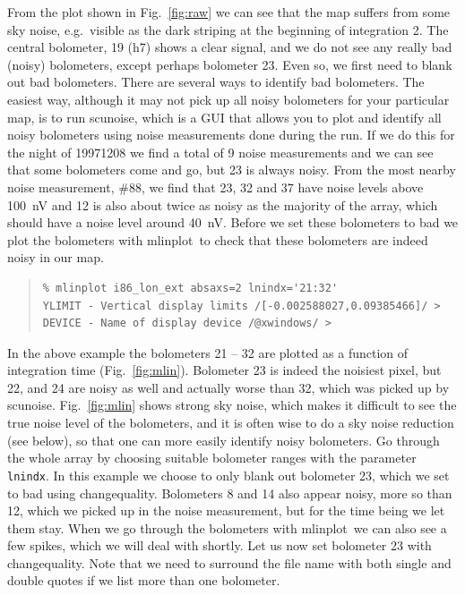 \documentclass[twoside,11pt]{article}
\newenvironment{myquote}{\begin{quote}\begin{small}}{\end{small}\end{quote}}
\newcommand{\task}[1]{\textsf{#1}}
\newcommand{\chgqual}{\xref{\task{change\_\-qua\-lity}}{sun216}{CHANGE_QUALITY}}
\newcommand{\scunoise}{\xref{\task{scunoise}}{sun216}{SCUNOISE}}
\newcommand{\mlinplot}{\xref{\task{mlinplot}}{sun95}{MLINPLOT}}
\newcommand{\xref}[3]{#1}
\renewcommand{\_}{\texttt{\symbol{95}}}
\begin{document}
From the plot shown in Fig.\ \ref{fig:raw} we can see that the map
suffers from some sky noise, e.g.\ visible as the dark striping at the
beginning of integration 2.  The central bolometer, 19 (h7) shows a
clear signal, and we do not see any really bad (noisy) bolometers,
except perhaps bolometer 23.  Even so, we first need to blank out bad
bolometers.  There are several ways to identify bad bolometers.  The
easiest way, although it may not pick up all noisy bolometers for your
particular map, is to run \scunoise, which is a GUI that allows you to
plot and identify all noisy bolometers using noise measurements done
during the run.  If we do this for the night of 19971208 we find a
total of 9 noise measurements and we can see that some bolometers come
and go, but 23 is always noisy.  From the most nearby noise
measurement, \#88, we find that 23, 32 and 37 have noise levels above
100~nV and 12 is also about twice as noisy as the majority of the
array, which should have a noise level around 40~nV. Before we set
these bolometers to bad we plot the bolometers with \mlinplot\ to
check that these bolometers are indeed noisy in our map.


\begin{myquote}
\begin{verbatim}
% mlinplot i86_lon_ext absaxs=2 lnindx='21:32'
YLIMIT - Vertical display limits /[-0.002588027,0.09385466]/ > 
DEVICE - Name of display device /@xwindows/ >
\end{verbatim}
\end{myquote}

In the above example the bolometers 21 -- 32 are plotted as a function
of integration time (Fig.\  \ref{fig:mlin}).  Bolometer 23 is indeed the
noisiest pixel, but 22, and 24 are noisy as well and actually worse
than 32, which was picked up by \scunoise.  Fig.\  \ref{fig:mlin} shows
strong sky noise, which makes it difficult to see the true noise level
of the bolometers, and it is often wise to do a sky noise reduction
(see below), so that one can more easily identify noisy bolometers. 
Go through the whole array by choosing suitable bolometer ranges with
the parameter \texttt{lnindx}.  In this example we choose to only
blank out bolometer 23, which we set to bad using \chgqual. 
Bolometers 8 and 14 also appear noisy, more so than 12, which we
picked up in the noise measurement, but for the time being we let them
stay.  When we go through the bolometers with \mlinplot\ we can also
see a few spikes, which we will deal with shortly.  Let us now set
bolometer 23 with \chgqual.  Note that we need to surround the file
name with both single and double quotes if we list more than one
bolometer.
\end{document}
